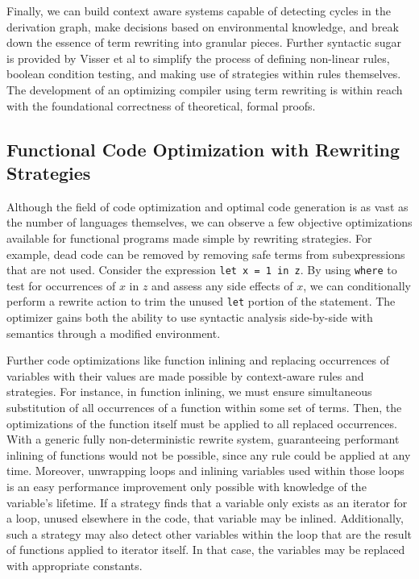 \documentclass{article}
\begin{document}
Finally, we can build context aware systems capable of detecting cycles in the derivation graph, make decisions based on environmental knowledge,
and break down the essence of term rewriting into granular pieces. Further syntactic sugar is provided by Visser et al \cite{elco1998building}
to simplify the process of defining non-linear rules, boolean condition testing, and making use of strategies within rules themselves.
The development of an optimizing compiler using term rewriting is within reach with the foundational correctness of theoretical, formal proofs.

\subsection{Functional Code Optimization with Rewriting Strategies}
Although the field of code optimization and optimal code generation is as vast as the number of languages themselves,
we can observe a few objective optimizations available for functional programs made simple by rewriting strategies.
For example, dead code can be removed by removing safe terms from subexpressions that are not used. Consider
the expression \texttt{let x = 1 in z}. By using \texttt{where} to test for occurrences of $x$ in $z$
and assess any side effects of $x$,
we can conditionally perform a rewrite action to trim the unused \texttt{let} portion of the statement.
The optimizer gains both the ability to use syntactic analysis side-by-side with semantics through a modified environment.

Further code optimizations like function inlining and replacing occurrences of variables with their values
are made possible by context-aware rules and strategies. For instance, in function inlining, we must ensure
simultaneous substitution of all occurrences of a function within some set of terms.
Then, the optimizations of the function itself must be applied to all replaced occurrences.
With a generic fully non-deterministic rewrite system, guaranteeing performant inlining of functions would
not be possible, since any rule could be applied at any time. Moreover, unwrapping loops
and inlining variables used within those loops is an easy performance improvement only possible with knowledge of the variable's lifetime.
If a strategy finds that a variable only exists as an iterator for a loop, unused elsewhere in the code, that variable may be inlined.
Additionally, such a strategy may also detect other variables within the loop that are the result of functions applied to iterator itself.
In that case, the variables may be replaced with appropriate constants.
\end{document}
